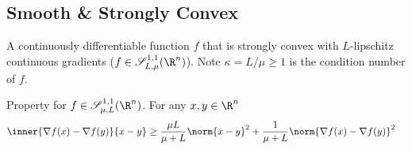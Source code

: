 \documentclass[../summary.tex]{subfiles}
\begin{document}
\subsection{Smooth \& Strongly Convex}

\begin{definition}
    A continuously differentiable function $f$ that is strongly convex with $L$-lipschitz continuous gradients ($f\in\scrS^{1,1}_{L,\mu}(\R^n)$). Note $\kappa = L/\mu \geq 1$ is the condition number of $f$.
\end{definition}

\noindent Property for $f\in\scrS_{\mu,L}^{1,1}(\R^n)$. For any $x,y\in\R^n$
\begin{align}
    \inner{\nabla f(x) - \nabla f(y)}{x-y}
        &\geq \frac{\mu L}{\mu + L}\norm{x-y}^2 + \frac{1}{\mu+L} \norm{\nabla f(x) - \nabla f(y)}^2
\end{align}
\end{document}
